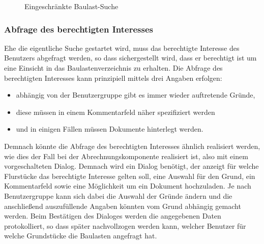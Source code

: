 \begin{figure}[htbp]
	\centering
	\caption{Eingeschränkte Baulast-Suche}
	\label{fig:baulast-suche}
\end{figure}

\subsubsection{Abfrage des berechtigten Interesses}
Ehe die eigentliche Suche gestartet wird, muss das berechtigte Interesse des Benutzers abgefragt werden, so dass sichergestellt wird, dass er berechtigt ist um eine Einsicht in das Baulastenverzeichnis zu erhalten.
Die Abfrage des berechtigten Interesses kann prinzipiell mittels drei Angaben erfolgen:
\begin{itemize}
\item abhängig von der Benutzergruppe gibt es immer wieder auftretende Gründe,
\item diese müssen in einem Kommentarfeld näher spezifiziert werden
\item und in einigen Fällen müssen Dokumente hinterlegt werden.
\end{itemize}
Demnach könnte die Abfrage des berechtigten Interesses ähnlich realisiert werden, wie dies der Fall bei der Abrechnungskomponente realisiert ist, also mit einem vorgeschalteten Dialog.
Demnach wird ein Dialog benötigt, der anzeigt für welche Flurstücke das berechtigte Interesse gelten soll, eine Auswahl für den Grund, ein Kommentarfeld sowie eine Möglichkeit um ein Dokument hochzuladen.
Je nach Benutzergruppe kann sich dabei die Auswahl der Gründe ändern und die anschließend auszufüllende Angaben könnten vom Grund abhängig gemacht werden.
Beim Bestätigen des Dialoges werden die angegebenen Daten protokolliert, so dass später nachvollzogen werden kann, welcher Benutzer für welche Grundstücke die Baulasten angefragt hat.

